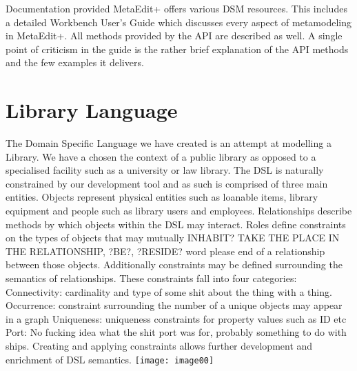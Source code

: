 \documentclass[12pt]{article}
\begin{document}
Documentation provided
MetaEdit+ offers various DSM resources. This includes a detailed Workbench User’s Guide which discusses every aspect of metamodeling in MetaEdit+. All methods provided by the API are described as well. A single point of criticism in the guide is the rather brief explanation of the API methods and the few examples it delivers.
\section{Library Language}
The Domain Specific Language we have created is an attempt at modelling a Library. We have a chosen the context of a public library as opposed to a specialised facility such as a university or law library. The DSL is naturally constrained by our development tool and as such  is comprised of three main entities. Objects represent physical entities such as loanable items, library equipment and people such as library users and employees. Relationships describe methods by which objects within the DSL may interact. Roles define constraints on the types of objects that may mutually INHABIT? TAKE THE PLACE IN THE RELATIONSHIP, ?BE?, ?RESIDE? word please  end of a relationship between those objects. Additionally constraints may be defined surrounding the semantics of relationships. These constraints fall into four categories:
Connectivity: cardinality and type of some shit about the thing with a thing. 
Occurrence: constraint surrounding the number of a unique objects may appear in a graph
Uniqueness: uniqueness constraints for property values such as ID etc
Port: No fucking idea what the shit port was for, probably something to do with ships.
Creating and applying constraints allows further development and enrichment of DSL semantics.  
\texttt{[image: image00]}


\end{document}

